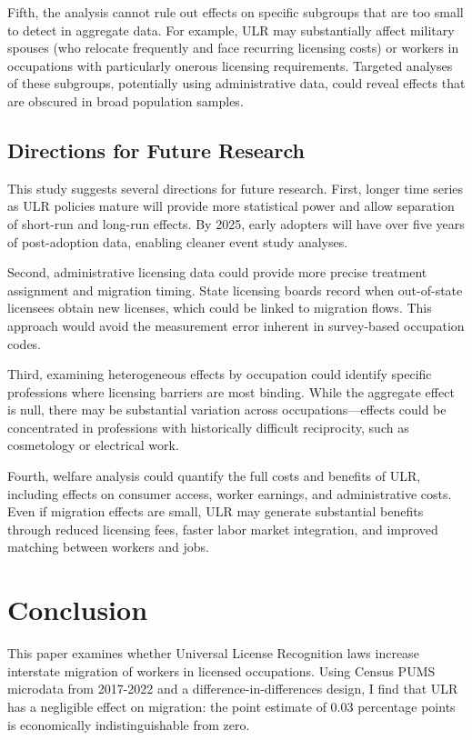 \documentclass[12pt]{article}
\begin{document}
Fifth, the analysis cannot rule out effects on specific subgroups that are too small to detect in aggregate data. For example, ULR may substantially affect military spouses (who relocate frequently and face recurring licensing costs) or workers in occupations with particularly onerous licensing requirements. Targeted analyses of these subgroups, potentially using administrative data, could reveal effects that are obscured in broad population samples.

\subsection{Directions for Future Research}

This study suggests several directions for future research. First, longer time series as ULR policies mature will provide more statistical power and allow separation of short-run and long-run effects. By 2025, early adopters will have over five years of post-adoption data, enabling cleaner event study analyses.

Second, administrative licensing data could provide more precise treatment assignment and migration timing. State licensing boards record when out-of-state licensees obtain new licenses, which could be linked to migration flows. This approach would avoid the measurement error inherent in survey-based occupation codes.

Third, examining heterogeneous effects by occupation could identify specific professions where licensing barriers are most binding. While the aggregate effect is null, there may be substantial variation across occupations---effects could be concentrated in professions with historically difficult reciprocity, such as cosmetology or electrical work.

Fourth, welfare analysis could quantify the full costs and benefits of ULR, including effects on consumer access, worker earnings, and administrative costs. Even if migration effects are small, ULR may generate substantial benefits through reduced licensing fees, faster labor market integration, and improved matching between workers and jobs.

\section{Conclusion}

This paper examines whether Universal License Recognition laws increase interstate migration of workers in licensed occupations. Using Census PUMS microdata from 2017-2022 and a difference-in-differences design, I find that ULR has a negligible effect on migration: the point estimate of 0.03 percentage points is economically indistinguishable from zero.
\end{document}
